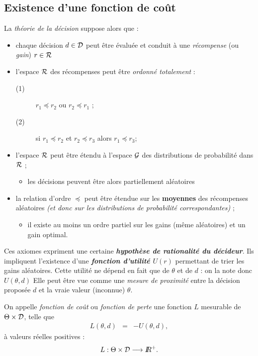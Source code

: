 \subsection{Existence d'une fonction de coût}

La \emph{théorie de la décision} suppose alors que : 
\begin{itemize}
\item chaque décision $d\in{\cal{D}}$ peut \^etre évaluée et conduit à une  \emph{récompense} (ou {\it gain}) $r\in{\cal{R}}$
\item \pause l'espace ${\cal{R}}$ des récompenses peut \^etre  \emph{ordonné totalement} :
\begin{description}
\item[(1)]   $r_1 \preceq r_2$ ou $r_2 \preceq r_1$ ;
\item[(2)]   si $r_1\preceq r_2$ et $r_2\preceq r_3$ alors $r_1\preceq r_3$; 
\end{description}
\item \pause   l'espace ${\cal{R}}$ peut \^etre étendu à l'espace ${\cal{G}}$ des distributions de probabilité dans ${\cal{R}}$ ;
\begin{itemize}
\item   {  les décisions peuvent \^etre alors partiellement aléatoires}
\end{itemize}
\item \pause la relation d'ordre $\preceq$ peut \^etre étendue sur les {\bf moyennes} des récompenses aléatoires {  \it (et donc sur les distributions de probabilité correspondantes)} ;
\begin{itemize}
\item    il existe au moins un ordre partiel sur les gains (m\^eme aléatoires) et un gain optimal.
\end{itemize}
\end{itemize}

 Ces axiomes expriment une certaine  \emph{\bf hypothèse de rationalité du décideur}. Ils impliquent l'existence d'une \emph{\bf fonction d'utilité $U(r)$} permettant de trier les gains aléatoires. Cette utilité ne dépend en fait que de $\theta$ et de $d$  : on la note donc 
 $U(\theta,d)$ Elle peut \^etre vue comme une  \emph{mesure de proximité} entre la décision proposée $d$ et la vraie valeur (inconnue) $\theta$. \\
 
 \begin{definition}
 On appelle \emph{fonction de co\^ut} ou \emph{fonction de perte} une fonction $L$ mesurable de $\Theta\times{\cal{D}}$, telle que 
 \begin{eqnarray*}
L(\theta,d) & =  & - U(\theta,d),
\end{eqnarray*}
à valeurs réelles positives : 
$$
L:\Theta\times{\cal{D}} \longrightarrow I\!\!R^+.
$$
 \end{definition}
 
